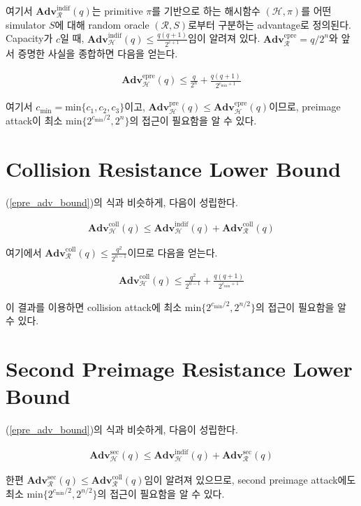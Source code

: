 \documentclass{article}
\newcommand{\adv}{\mathbf{Adv}}
\begin{document}
  여기서 \(\adv^\text{indif}_\mathcal{R}(q)\)는 primitive \(\pi\)를 기반으로 하는 해시함수 \((\mathcal{H}, \pi)\)를 어떤 simulator \(S\)에 대해 random oracle \((\mathcal{R}, S)\)로부터 구분하는 advantage로 정의된다. Capacity가 \(c\)일 때, \(\adv^\text{indif}_\mathcal{H}(q)\leq \frac{q(q + 1)}{2^{c + 1}}\)임이 알려져 있다.\cite{bertoni_indifferentiability_2008} \(\adv^\text{epre}_\mathcal{R}=q/2^n\)와 앞서 증명한 사실을 종합하면 다음을 얻는다.

  \begin{align*}
    \adv^\text{epre}_\mathcal{H}(q) \leq \frac{q}{2^n} + \frac{q(q + 1)}{2^{c_\mathrm{min} + 1}}
  \end{align*}

  여기서 \(c_\mathrm{min}=\mathrm{min}\{c_1, c_2, c_3\}\)이고, \(\adv^\text{pre}_\mathcal{H}(q) \leq \adv^\text{epre}_\mathcal{H}(q)\)이므로\cite{rogaway_cryptographic_2004}, preimage attack이 최소 \(\mathrm{min}\{2^{c_\mathrm{min}/2}, 2^n\}\)의 접근이 필요함을 알 수 있다.

  \section{Collision Resistance Lower Bound}
  (\ref{epre_adv_bound})의 식과 비슷하게, 다음이 성립한다.

  \begin{align*}
    \adv^\text{coll}_\mathcal{H}(q) \leq \adv^\text{indif}_\mathcal{H}(q) + \adv^\text{coll}_\mathcal{R}(q)
  \end{align*}

  여기에서 \(\adv^\text{coll}_\mathcal{R}(q) \leq \frac{q^2}{2^{n - 1}}\)이므로 다음을 얻는다.

  \begin{align*}
    \adv^\text{coll}_\mathcal{H}(q) \leq \frac{q^2}{2^{n - 1}} + \frac{q(q + 1)}{2^{c_\mathrm{min} + 1}}
  \end{align*}

  이 결과를 이용하면 collision attack에 최소 \(\mathrm{min}\{2^{c_\mathrm{min}/2}, 2^{n/2}\}\)의 접근이 필요함을 알 수 있다.

  \section{Second Preimage Resistance Lower Bound}
  (\ref{epre_adv_bound})의 식과 비슷하게, 다음이 성립한다.

  \begin{align*}
    \adv^\text{sec}_\mathcal{H}(q) \leq \adv^\text{indif}_\mathcal{H}(q) + \adv^\text{sec}_\mathcal{R}(q)
  \end{align*}

  한편 \(\adv^\text{sec}_\mathcal{R}(q) \leq \adv^\text{coll}_\mathcal{R}(q)\)임이 알려져 있으므로, second preimage attack에도 최소 \(\mathrm{min}\{2^{c_\mathrm{min}/2}, 2^{n/2}\}\)의 접근이 필요함을 알 수 있다.
  \printbibliography
\end{document}
